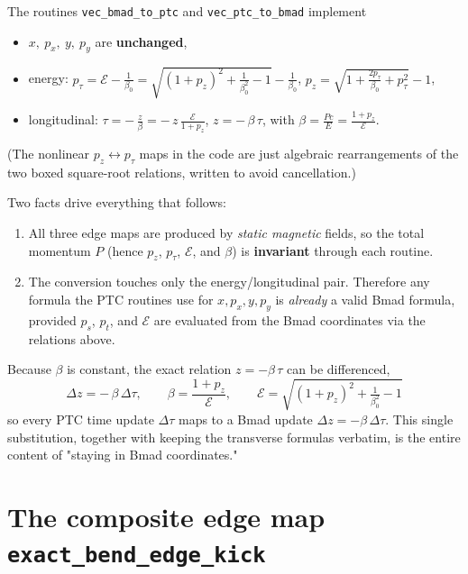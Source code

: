 \documentclass[11pt]{article}
\newcommand{\code}[1]{\texttt{#1}}
\newcommand{\ptcE}{\mathcal{E}}          %
\begin{document}
The routines \code{vec\_bmad\_to\_ptc} and \code{vec\_ptc\_to\_bmad} implement
\begin{keybox}
\begin{itemize}
\item[] $x,\ p_x,\ y,\ p_y$ \quad are \textbf{unchanged},
\item[] energy: \quad
  $\displaystyle p_\tau = \ptcE - \frac{1}{\beta_0}
     = \sqrt{(1+p_z)^2 + \tfrac{1}{\beta_0^2} - 1} - \frac{1}{\beta_0}$,
  \qquad
  $p_z = \sqrt{1 + \tfrac{2 p_\tau}{\beta_0} + p_\tau^2} - 1$,
\item[] longitudinal: \quad
  $\displaystyle \tau = -\,\frac{z}{\beta}
     = -\,z\,\frac{\ptcE}{1+p_z}$,
  \qquad
  $z = -\,\beta\,\tau$,
  \qquad with
  $\displaystyle \beta = \frac{Pc}{E} = \frac{1+p_z}{\ptcE}$.
\end{itemize}
\end{keybox}
\noindent
(The nonlinear $p_z \leftrightarrow p_\tau$ maps in the code are just algebraic
rearrangements of the two boxed square-root relations, written to avoid
cancellation.)

Two facts drive everything that follows:
\begin{enumerate}
\item All three edge maps are produced by \emph{static magnetic} fields, so the
  total momentum $P$ (hence $p_z$, $p_\tau$, $\ptcE$, and $\beta$) is
  \textbf{invariant} through each routine.
\item The conversion touches only the energy/longitudinal pair. Therefore any
  formula the PTC routines use for $x, p_x, y, p_y$ is \emph{already} a valid
  Bmad formula, provided $p_s$, $p_t$, and $\ptcE$ are evaluated from the Bmad
  coordinates via the relations above.
\end{enumerate}

Because $\beta$ is constant, the exact relation $z = -\beta\,\tau$ can be
differenced,
\begin{equation}
  \boxed{\;\Delta z = -\,\beta\,\Delta\tau,
    \qquad \beta = \frac{1+p_z}{\ptcE},
    \qquad \ptcE = \sqrt{(1+p_z)^2 + \tfrac{1}{\beta_0^2} - 1}\;}
  \label{eq:ztau}
\end{equation}
so every PTC time update $\Delta\tau$ maps to a Bmad update
$\Delta z = -\beta\,\Delta\tau$. This single substitution, together with keeping
the transverse formulas verbatim, is the entire content of "staying in Bmad
coordinates."

\section{The composite edge map \code{exact\_bend\_edge\_kick}}
\end{document}
